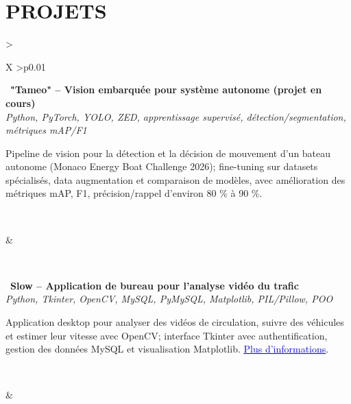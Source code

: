 \documentclass[letterpaper,10pt]{article}
\newcommand{\indentbox}[2][1em]{\hspace*{#1}\parbox{\dimexpr\linewidth-#1\relax}{#2}}
\begin{document}
\vspace{0.14cm}
\section{\textcolor{mydarkgreen}{\textbf{PROJETS}}}

  \begin{tabularx}{\textwidth}{>{\raggedright\arraybackslash}X >{\raggedleft\arraybackslash}p{0.01\textwidth}}

    \begin{minipage}[t]{\linewidth}\raggedright
      \textbullet\ \textbf{"Tameo" -- Vision embarquée pour système autonome (projet en cours)}\\
      \textit{\footnotesize Python, PyTorch, YOLO, ZED, apprentissage supervisé, détection/segmentation, métriques mAP/F1}\\
      \indentbox{\footnotesize Pipeline de vision pour la détection et la décision de mouvement d'un bateau autonome (Monaco Energy Boat Challenge 2026); fine-tuning sur datasets spécialisés, data augmentation et comparaison de modèles, avec amélioration des métriques mAP, F1, précision/rappel d'environ 80 \% à 90 \%.}\\
    \end{minipage}
    &
    \begin{minipage}[t]{\linewidth}\raggedleft
    \end{minipage}\\

    \begin{minipage}[t]{\linewidth}\raggedright
      \textbullet\ \textbf{Slow -- Application de bureau pour l'analyse vidéo du trafic}\\
      \textit{\footnotesize Python, Tkinter, OpenCV, MySQL, PyMySQL, Matplotlib, PIL/Pillow, POO}\\
      \indentbox{\footnotesize Application desktop pour analyser des vidéos de circulation, suivre des véhicules et estimer leur vitesse avec OpenCV; interface Tkinter avec authentification, gestion des données MySQL et visualisation Matplotlib. \href{https://github.com/JavierTarazona06/slow}{\textcolor{blue}{\underline{Plus d'informations}}}.}\\
    \end{minipage}
    &
    \begin{minipage}[t]{\linewidth}\raggedleft
    \end{minipage}\\

  \end{tabularx}
\end{document}
